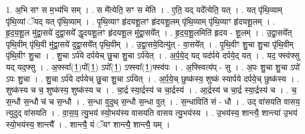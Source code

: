 \documentclass[17pt]{extarticle}
\begin{document}
1. अ॒भि सꣳ स म॒भ्य॑भि सम् । . स मे᳚त्येति॒ सꣳ स मे॑ति । . ए॒ति॒ यद् यदे᳚त्येति॒ यत् । . यत् पृ॑थि॒व्याम् पृ॑थि॒व्यां ॅयद् यत् पृ॑थि॒व्याम् । . पृ॒थि॒व्याꣳ हृ॑दयशू॒लꣳ हृ॑दयशू॒लम् पृ॑थि॒व्याम् पृ॑थि॒व्याꣳ हृ॑दयशू॒लम् । . हृ॒द॒य॒शू॒ल मु॑द्वा॒सये॑ दुद्वा॒सये᳚ द्धृदयशू॒लꣳ हृ॑दयशू॒ल मु॑द्वा॒सये᳚त् । . हृ॒द॒य॒शू॒लमिति॑ हृदय - शू॒लम् । . उ॒द्वा॒सये᳚त् पृथि॒वीम् पृ॑थि॒वी मु॑द्वा॒सये॑ दुद्वा॒सये᳚त् पृथि॒वीम् । . उ॒द्वा॒सये॒दित्यु॑त् - वा॒सये᳚त् । . पृ॒थि॒वीꣳ शु॒चा शु॒चा पृ॑थि॒वीम् पृ॑थि॒वीꣳ शु॒चा । . शु॒चा ऽर्प॑ये दर्पयेच् छु॒चा शु॒चा ऽर्प॑येत् । . अ॒र्प॒ये॒द् यद् यद॑र्पये दर्पये॒द् यत् । . यद॒ फ्स्व॑फ्सु यद् यद॒फ्सु । . अ॒फ्स्वा᳚(1॒)पो᳚(1॒) ऽपो᳚(1॒) ऽफ्स्वा᳚(1॒)फ्स्व॑पः । . अ॒फ्स्वित्य॑प् - सु । . अ॒पः शु॒चा शु॒चा ऽपो॑ ऽपः शु॒चा । . शु॒चा ऽर्प॑ये दर्पयेच् छु॒चा शु॒चा ऽर्प॑येत् । . अ॒र्प॒ये॒च् छुष्क॑स्य॒ शुष्क॑ स्यार्पये दर्पये॒च् छुष्क॑स्य । . शुष्क॑स्य च च॒ शुष्क॑स्य॒ शुष्क॑स्य च । . चा॒र्द्र स्या॒र्द्रस्य॑ च चा॒र्द्रस्य॑ । . आ॒र्द्रस्य॑ च चा॒र्द्र स्या॒र्द्रस्य॑ च । . च॒ स॒न्धौ स॒न्धौ च॑ च स॒न्धौ । . स॒न्धा वुदुथ् स॒न्धौ स॒न्धा वुत् । . स॒न्धाविति॑ सं - धौ । . उद् वा॑सयति वासय॒ त्युदुद् वा॑सयति । . वा॒स॒य॒ त्यु॒भय॑ स्यो॒भय॑स्य वासयति वासय त्यु॒भय॑स्य । . उ॒भय॑स्य॒ शान्त्यै॒ शान्त्या॑ उ॒भय॑ स्यो॒भय॑स्य॒ शान्त्यै᳚ । . शान्त्यै॒ यं ॅयꣳ शान्त्यै॒ शान्त्यै॒ यम् । \newline
\end{document}
